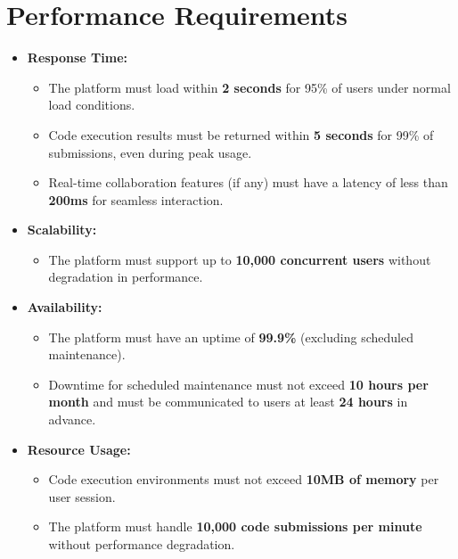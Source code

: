 \documentclass[a4paper, 11pt]{scrreprt}
\begin{document}
\section{Performance Requirements}
\begin{itemize}
    \item \textbf{Response Time:}
    \begin{itemize}
        \item The platform must load within \textbf{2 seconds} for 95\% of users under normal load conditions.
        \item Code execution results must be returned within \textbf{5 seconds} for 99\% of submissions, even during peak usage.
        \item Real-time collaboration features (if any) must have a latency of less than \textbf{200ms} for seamless interaction.
    \end{itemize}
    
    \item \textbf{Scalability:}
    \begin{itemize}
        \item The platform must support up to \textbf{10,000 concurrent users} without degradation in performance.
    \end{itemize}
    
    \item \textbf{Availability:}
    \begin{itemize}
        \item The platform must have an uptime of \textbf{99.9\%} (excluding scheduled maintenance).
        \item Downtime for scheduled maintenance must not exceed \textbf{10 hours per month} and must be communicated to users at least \textbf{24 hours} in advance.
    \end{itemize}

    \item \textbf{Resource Usage:}
    \begin{itemize}
        \item Code execution environments must not exceed \textbf{10MB of memory} per user session.
        \item The platform must handle \textbf{10,000 code submissions per minute} without performance degradation.
    \end{itemize}
\end{itemize}
\end{document}
